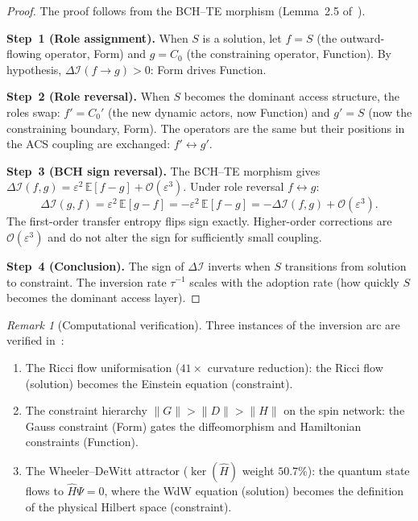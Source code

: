 \documentclass[11pt,a4paper]{article}
\theoremstyle{plain}
\theoremstyle{definition}
\theoremstyle{remark}
\newtheorem{remark}[theorem]{Remark}
\newcommand{\DI}{\Delta\mathcal{I}}
\newcommand{\Order}[1]{\mathcal{O}(#1)}
\newcommand{\eps}{\varepsilon}
\begin{document}
\begin{proof}
The proof follows from the BCH--TE morphism (Lemma~2.5 of~\cite{Wallace2026a}).

\textbf{Step~1 (Role assignment).}
When $S$ is a solution, let $f = S$ (the outward-flowing operator, Form)
and $g = C_0$ (the constraining operator, Function).  By hypothesis,
$\DI(f \to g) > 0$: Form drives Function.

\textbf{Step~2 (Role reversal).}
When $S$ becomes the dominant access structure, the roles swap:
$f' = C_0'$ (the new dynamic actors, now Function) and $g' = S$
(now the constraining boundary, Form).  The operators are the same
but their positions in the ACS coupling are exchanged: $f' \leftrightarrow g'$.

\textbf{Step~3 (BCH sign reversal).}
The BCH--TE morphism gives $\DI(f, g) = \eps^2\,\mathbb{E}[f - g] + \Order{\eps^3}$.
Under role reversal $f \leftrightarrow g$:
\[
  \DI(g, f) = \eps^2\,\mathbb{E}[g - f] = -\eps^2\,\mathbb{E}[f - g]
  = -\DI(f, g) + \Order{\eps^3}.
\]
The first-order transfer entropy flips sign exactly.  Higher-order
corrections are $\Order{\eps^3}$ and do not alter the sign for
sufficiently small coupling.

\textbf{Step~4 (Conclusion).}
The sign of $\DI$ inverts when $S$ transitions from solution to
constraint.  The inversion rate $\tau^{-1}$ scales with the adoption
rate (how quickly $S$ becomes the dominant access layer).
\end{proof}

\begin{remark}[Computational verification]
Three instances of the inversion arc are verified in~\cite{Wallace2026a}:
\begin{enumerate}[noitemsep]
  \item The Ricci flow uniformisation ($41\times$ curvature reduction):
    the Ricci flow (solution) becomes the Einstein equation (constraint).
  \item The constraint hierarchy $\|G\| > \|D\| > \|H\|$ on the spin network:
    the Gauss constraint (Form) gates the diffeomorphism and Hamiltonian
    constraints (Function).
  \item The Wheeler--DeWitt attractor ($\ker(\hat{H})$ weight $50.7\%$):
    the quantum state flows to $\hat{H}\Psi = 0$, where the WdW equation
    (solution) becomes the definition of the physical Hilbert space
    (constraint).
\end{enumerate}
\end{remark}
\end{document}
